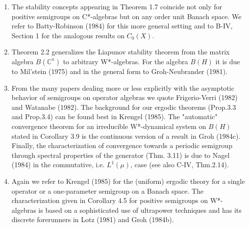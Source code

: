 \begin{enumerate}[label=\emph{Section \arabic*:}, wide]
\item
The stability concepts appearing in Theorem 1.7 coincide not only for positive semigroups on C*-algebras but on any order unit Banach space.
We refer to Batty-Robinson (1984) for this more general setting and to B-IV, Section 1 for the analogous results on \(C_{0}(X)\).

\item
Theorem 2.2 generalizes the Liapunov stability theorem from the matrix algebra \(B(\mathbb{C}^{n})\) to arbitrary W*-algebras.
For the algebra \(B(H)\) it is due to Mil'stein (1975) and in the general form to Groh-Neubrander (1981).

\item
From the many papers dealing more or less explicitly with the asymptotic behavior of semigroups on operator algebras we quote Frigerio-Verri (1982) and Watanabe (1982).
The background for our ergodic theorems (Prop.3.3 and Prop.3.4) can be found best in Krengel (1985).
The "automatic" convergence theorem for an irreducible W*-dynamical system on \(B(H)\) stated in Corollary 3.9 is the continuous version of a result in Groh (1984c).
Finally, the characterization of convergence towards a periodic semigroup through spectral properties of the generator (Thm. 3.11) is due to Nagel (1984) in the commutative, i.e. \(L^{1}(\mu)\), case (see also C-IV, Thm.2.14).

\item
Again we refer to Krengel (1985) for the (uniform) ergodic theory for a single operator or a one-parameter semigroup on a Banach space.
The characterization given in Corollary 4.5 for positive semigroups on W*-algebras is based on a sophisticated use of ultrapower techniques and has its discrete forerunners in Lotz (1981) and Groh (1984b).
\end{enumerate}

